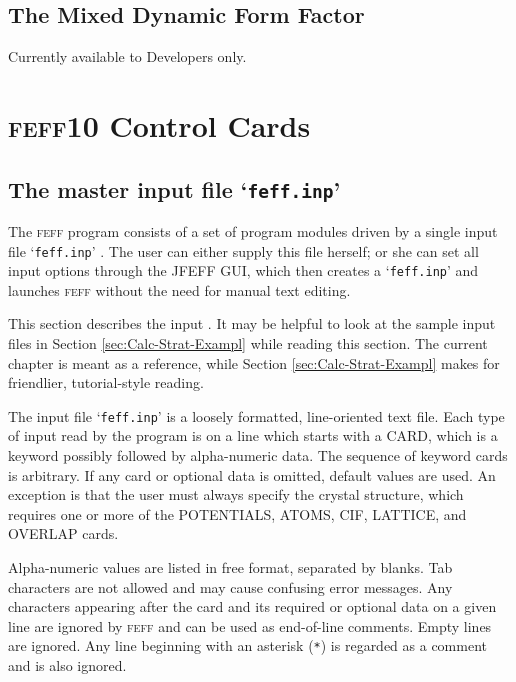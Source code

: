 \documentclass[11pt,oneside]{report} %
\newcommand{\program}[1]{\textsc{#1}}
\newcommand{\feff}{\program{feff}}
\newcommand{\vnum}{10}
\newcommand{\feffcur}{\feff\vnum}
\newcommand{\file}[1]{`\texttt{#1}'}
\begin{document}
\section{The Mixed Dynamic Form Factor}
\label{sec:MDFF}

Currently available to Developers only.



\chapter{{\feffcur} Control Cards}
\label{sec:Input-Control-Cards}

\section{The master input file \file{feff.inp}}

The {\feff} program consists of a set of program modules driven by  a single input file \file{feff.inp} .  The user can either supply this file
 herself; or she can set all input options through the JFEFF GUI, which then
 creates a {\file{feff.inp}} and launches {\feff} without the need for 
 manual text editing.

This section describes the input . It may be helpful to look at the
sample input files in Section \ref{sec:Calc-Strat-Exampl} while
reading this section.  The current chapter is meant as a reference,
while Section \ref{sec:Calc-Strat-Exampl} makes for friendlier, tutorial-style reading.

The input file \file{feff.inp} is a loosely formatted, line-oriented
text file. Each type of input read by the program is on a line which
starts with a CARD, which is a keyword possibly followed by alpha-numeric data.  The sequence of keyword cards is arbitrary. If any card or optional data is omitted,
default values are used.  An exception is that the user must always specify the crystal structure, which requires one or more of the POTENTIALS, ATOMS, CIF, LATTICE, and OVERLAP cards.

Alpha-numeric values are listed in free format,
separated by blanks. Tab characters are not allowed and may cause confusing error
messages. Any characters appearing after the card and its required or
optional data on a given line are ignored by {\feff} and can be used
as end-of-line comments. Empty lines are ignored. Any
line beginning with an asterisk (\texttt{*}) is regarded as a comment
and is also ignored. 
\end{document}
